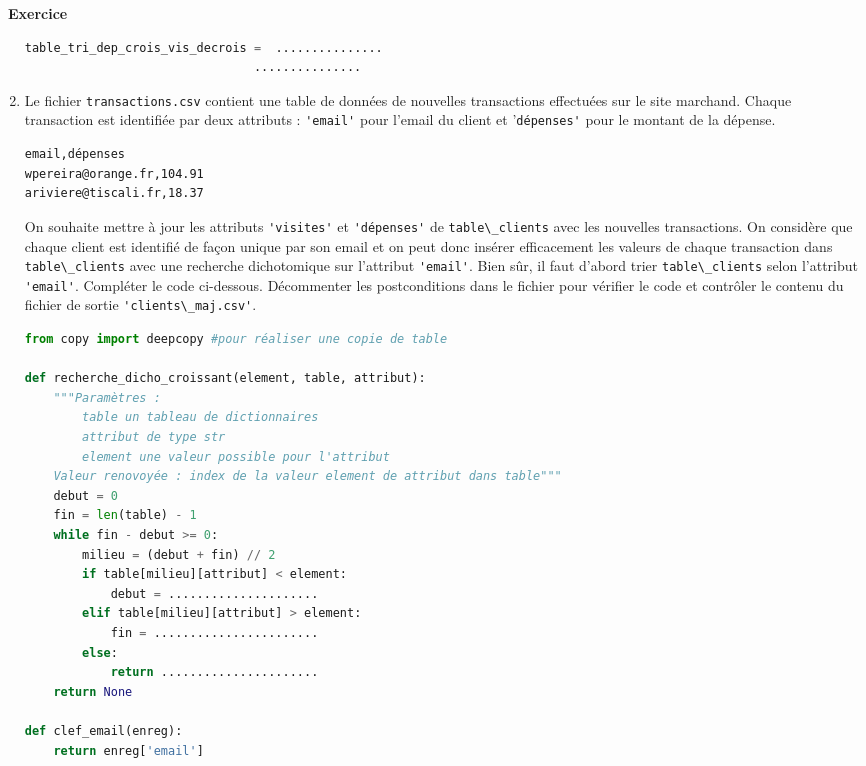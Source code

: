 \documentclass[
  11pt,
]{article}
\newcommand{\passthrough}[1]{#1}
\newcounter{exo}
\newenvironment{exercice}[1]
{\par \medskip   \addtocounter{exo}{1} \noindent  
\begin{bclogo}[arrondi =0.1,   noborder = true, logo=\bccrayon, marge=4]{~\textbf{Exercice} \textbf{\theexo} {\itshape #1} }  \par}
{
\end{bclogo}
 \par \bigskip }
\newcounter{def}
\begin{document}
\begin{exercice}{}
\begin{enumerate}
\begin{lstlisting}[language=Python]
table_tri_dep_crois_vis_decrois =  ...............
                                ...............
\end{lstlisting}
\item
  Le fichier \passthrough{\lstinline!transactions.csv!} contient une
  table de données de nouvelles transactions effectuées sur le site
  marchand. Chaque transaction est identifiée par deux attributs :
  \passthrough{\lstinline!'email'!} pour l'email du client et
  '\passthrough{\lstinline!dépenses'!} pour le montant de la dépense.

\begin{lstlisting}
email,dépenses
wpereira@orange.fr,104.91
ariviere@tiscali.fr,18.37
\end{lstlisting}

  On souhaite mettre à jour les attributs
  \passthrough{\lstinline!'visites'!} et
  \passthrough{\lstinline!'dépenses'!} de
  \passthrough{\lstinline!table\_clients!} avec les nouvelles
  transactions. On considère que chaque client est identifié de façon
  unique par son email et on peut donc insérer efficacement les valeurs
  de chaque transaction dans \passthrough{\lstinline!table\_clients!}
  avec une recherche dichotomique sur l'attribut
  \passthrough{\lstinline!'email'!}. Bien sûr, il faut d'abord trier
  \passthrough{\lstinline!table\_clients!} selon l'attribut
  \passthrough{\lstinline!'email'!}. Compléter le code ci-dessous.
  Décommenter les postconditions dans le fichier pour vérifier le code
  et contrôler le contenu du fichier de sortie
  \passthrough{\lstinline!'clients\_maj.csv'!}.

\begin{lstlisting}[language=Python]
from copy import deepcopy #pour réaliser une copie de table

def recherche_dicho_croissant(element, table, attribut):
    """Paramètres :
        table un tableau de dictionnaires
        attribut de type str
        element une valeur possible pour l'attribut
    Valeur renovoyée : index de la valeur element de attribut dans table"""
    debut = 0
    fin = len(table) - 1
    while fin - debut >= 0:
        milieu = (debut + fin) // 2
        if table[milieu][attribut] < element:
            debut = .....................
        elif table[milieu][attribut] > element:
            fin = .......................
        else:
            return ......................
    return None

def clef_email(enreg):
    return enreg['email']


\end{lstlisting}
\end{enumerate}
\end{exercice}
\end{document}
